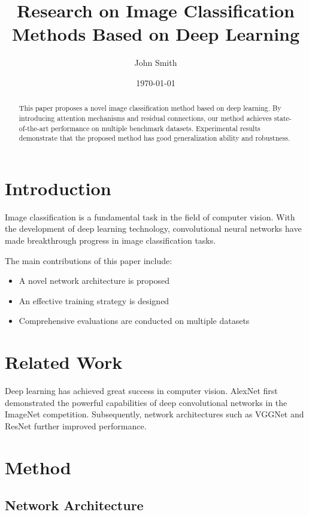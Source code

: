 \documentclass[12pt]{article}
\title{Research on Image Classification Methods Based on Deep Learning}
\author{John Smith}
\date{\today}
\begin{document}
\maketitle

\begin{abstract}
This paper proposes a novel image classification method based on deep learning.
By introducing attention mechanisms and residual connections, our method achieves state-of-the-art performance on multiple benchmark datasets.
Experimental results demonstrate that the proposed method has good generalization ability and robustness.
\end{abstract}

\section{Introduction}

Image classification is a fundamental task in the field of computer vision.
With the development of deep learning technology, convolutional neural networks have made breakthrough progress in image classification tasks.

The main contributions of this paper include:
\begin{itemize}
    \item A novel network architecture is proposed
    \item An effective training strategy is designed
    \item Comprehensive evaluations are conducted on multiple datasets
\end{itemize}

\section{Related Work}

Deep learning has achieved great success in computer vision.
AlexNet first demonstrated the powerful capabilities of deep convolutional networks in the ImageNet competition.
Subsequently, network architectures such as VGGNet and ResNet further improved performance.

\section{Method}

\subsection{Network Architecture}
\end{document}
